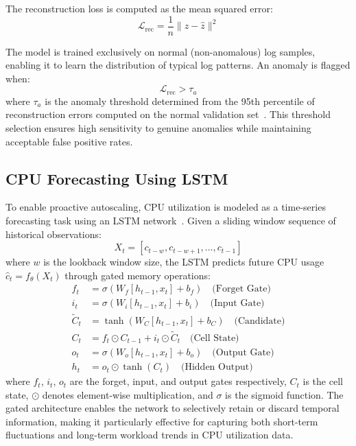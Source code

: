 \documentclass[sn-nature]{sn-jnl}
\theoremstyle{thmstyleone}
\theoremstyle{thmstyletwo}
\theoremstyle{thmstylethree}
\begin{document}
The reconstruction loss is computed as the mean squared error:
\begin{equation}
\mathcal{L}_{\mathrm{rec}} = \frac{1}{n}\|z - \hat{z}\|^2
\end{equation}

The model is trained exclusively on normal (non-anomalous) log samples, enabling it to learn the distribution of typical log patterns. An anomaly is flagged when:
\begin{equation}
\mathcal{L}_{\mathrm{rec}} > \tau_a
\end{equation}
where $\tau_a$ is the anomaly threshold determined from the 95th percentile of reconstruction errors computed on the normal validation set~\cite{sakurada2014anomaly}. This threshold selection ensures high sensitivity to genuine anomalies while maintaining acceptable false positive rates.

\subsection{CPU Forecasting Using LSTM}\label{subsec:cpuforecast}

To enable proactive autoscaling, CPU utilization is modeled as a time-series forecasting task using an LSTM network~\cite{hochreiter1997lstm}. Given a sliding window sequence of historical observations:
\begin{equation}
X_t = [c_{t-w}, c_{t-w+1}, \ldots, c_{t-1}]
\end{equation}
where $w$ is the lookback window size, the LSTM predicts future CPU usage $\hat{c}_t = f_{\theta}(X_t)$ through gated memory operations:
\begin{align}
f_t &= \sigma(W_f [h_{t-1}, x_t] + b_f) \quad \text{(Forget Gate)} \label{eq:forget}\\
i_t &= \sigma(W_i [h_{t-1}, x_t] + b_i) \quad \text{(Input Gate)} \label{eq:input}\\
\tilde{C}_t &= \tanh(W_C [h_{t-1}, x_t] + b_C) \quad \text{(Candidate)} \label{eq:candidate}\\
C_t &= f_t \odot C_{t-1} + i_t \odot \tilde{C}_t \quad \text{(Cell State)} \label{eq:cell}\\
o_t &= \sigma(W_o [h_{t-1}, x_t] + b_o) \quad \text{(Output Gate)} \label{eq:output}\\
h_t &= o_t \odot \tanh(C_t) \quad \text{(Hidden Output)} \label{eq:hidden}
\end{align}
where $f_t$, $i_t$, $o_t$ are the forget, input, and output gates respectively, $C_t$ is the cell state, $\odot$ denotes element-wise multiplication, and $\sigma$ is the sigmoid function. The gated architecture enables the network to selectively retain or discard temporal information, making it particularly effective for capturing both short-term fluctuations and long-term workload trends in CPU utilization data.
\end{document}
